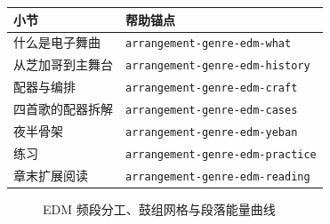 \begin{helpmapping}
\begin{longtable}{p{}p{}}
\toprule
小节 & 帮助锚点 \\
\midrule
什么是电子舞曲 & \texttt{arrangement-genre-edm-what} \\
从芝加哥到主舞台 & \texttt{arrangement-genre-edm-history} \\
配器与编排 & \texttt{arrangement-genre-edm-craft} \\
四首歌的配器拆解 & \texttt{arrangement-genre-edm-cases} \\
夜半骨架 & \texttt{arrangement-genre-edm-yeban} \\
练习 & \texttt{arrangement-genre-edm-practice} \\
章末扩展阅读 & \texttt{arrangement-genre-edm-reading} \\
\bottomrule
\end{longtable}
\end{helpmapping}

\begin{figure}[htbp]\centering
{}
\caption{EDM 频段分工、鼓组网格与段落能量曲线}
\end{figure}
